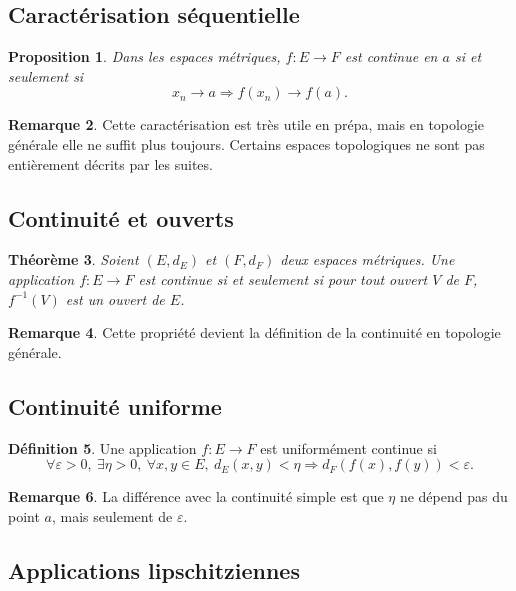 \documentclass[11pt,a4paper]{article}
\theoremstyle{definition}
\newtheorem{definition}{Définition}[section]
\newtheorem{remarque}[definition]{Remarque}
\theoremstyle{plain}
\newtheorem{proposition}[definition]{Proposition}
\newtheorem{theoreme}[definition]{Théorème}
\newcommand{\eps}{\varepsilon}
\begin{document}
\subsection{Caractérisation séquentielle}

\begin{proposition}
Dans les espaces métriques, $f:E\to F$ est continue en $a$ si et seulement si
\[
x_n\to a \Rightarrow f(x_n)\to f(a).
\]
\end{proposition}

\begin{remarque}
Cette caractérisation est très utile en prépa, mais en topologie générale elle ne suffit plus toujours. Certains espaces topologiques ne sont pas entièrement décrits par les suites.
\end{remarque}

\subsection{Continuité et ouverts}

\begin{theoreme}
Soient $(E,d_E)$ et $(F,d_F)$ deux espaces métriques.
Une application $f:E\to F$ est continue si et seulement si pour tout ouvert $V$ de $F$, $f^{-1}(V)$ est un ouvert de $E$.
\end{theoreme}

\begin{remarque}
Cette propriété devient la définition de la continuité en topologie générale.
\end{remarque}

\subsection{Continuité uniforme}

\begin{definition}
Une application $f:E\to F$ est uniformément continue si
\[
\forall \eps>0,\ \exists \eta>0,\ \forall x,y\in E,\ d_E(x,y)<\eta
\Rightarrow
d_F(f(x),f(y))<\eps.
\]
\end{definition}

\begin{remarque}
La différence avec la continuité simple est que $\eta$ ne dépend pas du point $a$, mais seulement de $\eps$.
\end{remarque}

\subsection{Applications lipschitziennes}
\end{document}
